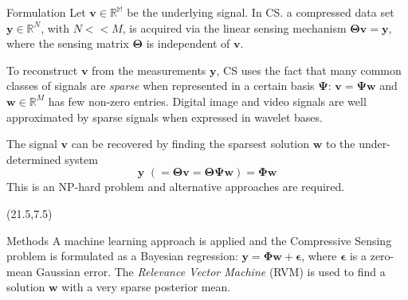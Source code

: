 \documentclass[final]{beamer}
\begin{document}
\begin{frame}{}
\begin{textblock}{19.5}
\begin{block}{Formulation}
Let $\bm v \in \mathbb{R^M}$ be the underlying signal.
In CS. a compressed data set $\bm y \in\mathbb{R}^N$, with $N<<M$, is acquired
 via the linear sensing mechanism $\bm\Theta\bm v = \bm y$, where the sensing matrix $\bm\Theta$ is independent of $\bm v$.

To reconstruct $\bm v$ from the measurements $\bm y$, CS uses the fact that many common classes of signals are \emph{sparse}
when represented in a certain basis $\bm\Psi$: $\bm v = \bm\Psi\bm w$ and $\bm w\in\mathbb{R}^M$ has few non-zero entries.
Digital image and video signals are well approximated by sparse signals when expressed in wavelet bases.

The signal $\bm v$ can be recovered by finding the sparsest solution $\bm w$ to the under-determined system
\begin{equation*}
  \bm y\,\, (=\bm\Theta\bm v = \bm\Theta\bm\Psi\bm w )= \bm\Phi\bm w 
\end{equation*}
This is an NP-hard problem and alternative approaches are required.
\end{block}


\end{textblock}


\begin{textblock}{19.5}(21.5,7.5)

\begin{block}{Methods}
A machine learning approach is applied and the Compressive Sensing problem is formulated as a Bayesian regression: $\bm y = \bm\Phi\bm w + \bm\epsilon$, where $\bm\epsilon$ is a zero-mean Gaussian error.%
The \emph{Relevance Vector Machine} (RVM) \cite{tipping2001,tipping2003} is used to find a solution $\bm w$ with a 
very sparse posterior mean.
\end{block}


\end{textblock}
\end{frame}
\end{document}
